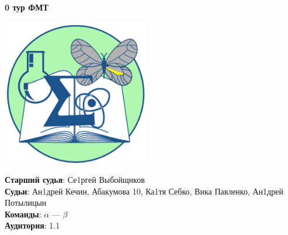 \documentclass[12pt]{article}
\begin{document}
\begin{center}
{\Huge \bf 0 тур ФМТ}
\end{center}
\begin{minipage}{.30\textwidth}
\begin{center}
\includegraphics[width=0.48\textwidth]{klshlogo.pdf}
\end{center}
\end{minipage}
\begin{minipage}{.65\textwidth}
\begin{flushleft}
{\bf Старший судья}: Се1ргей Выбойщиков\\ 
{\bf Судьи}: Ан1дрей Кечин, Абакумова 10, Ка1тя Себко, Вика Павленко, Ан1дрей Потылицын\\ 
{\bf Команды}: $\alpha$ --- $\beta$\\ 
{\bf Аудитория}: 1.1\\ 
\end{flushleft}
\end{minipage}
\end{document}
